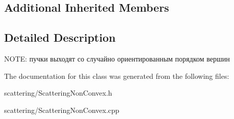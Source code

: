 \subsection*{Additional Inherited Members}


\subsection{Detailed Description}
N\+O\+TE\+: пучки выходят со случайно ориентированным порядком вершин 

The documentation for this class was generated from the following files\+:\begin{DoxyCompactItemize}
\item 
scattering/Scattering\+Non\+Convex.\+h\item 
scattering/Scattering\+Non\+Convex.\+cpp\end{DoxyCompactItemize}
